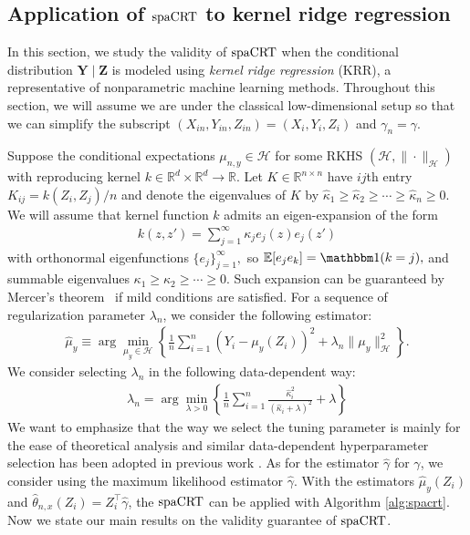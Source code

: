 \documentclass[12pt]{article}
\theoremstyle{definition}
\newcommand{\E}{\mathbb E}								%
\newcommand{\indicator}{\mathbbm 1}						%
\newcommand{\srx}{X}									%
\newcommand{\prz}{\bm Z}								%
\newcommand{\srz}{Z}									%
\newcommand{\pry}{{\bm Y}}								%
\newcommand{\sry}{Y}									%
\newcommand{\spacrt}{\textnormal{spaCRT}}               %
\begin{document}
\subsection{Application of $\spacrt$ to kernel ridge regression}\label{sec:theory_nonparametric_RF_classification}


In this section, we study the validity of $\spacrt$ when the conditional distribution $\pry\mid \prz$ is modeled using \textit{kernel ridge regression} (KRR), a representative of nonparametric machine learning methods. Throughout this section, we will assume we are under the classical low-dimensional setup so that we can simplify the subscript $(\srx_{in},\sry_{in},\srz_{in})=(\srx_{i},\sry_{i},\srz_{i})$ and $\gamma_n=\gamma$. 

Suppose the conditional expectations $\mu_{n,y}\in\mathcal{H}$ for some RKHS $(\mathcal{H},\|\cdot\|_{\mathcal{H}})$ with reproducing kernel $k\in\mathbb{R}^{d}\times \mathbb{R}^d\rightarrow\mathbb{R}$. Let $K\in\mathbb{R}^{n\times n}$ have $ij$th entry $K_{ij}=k(\srz_{i},\srz_{j})/n$ and denote the eigenvalues of $K$ by $\widehat{\kappa}_{1}\geq\widehat{\kappa}_2\geq\cdots\geq\widehat{\kappa}_n\geq 0$. We will assume that kernel function $k$ admits an eigen-expansion of the form 
\begin{align}\label{eq:eigven_expansion}
  k(z,z')=\sum_{j=1}^{\infty}\kappa_{j}e_j(z)e_j(z')
\end{align}
with orthonormal eigenfunctions $\{e_{j}\}_{j=1}^{\infty},$ so $\E[e_je_k]=\indicator(k=j),$ and summable eigenvalues $\kappa_1\geq\kappa_2\geq\cdots\geq0$. Such expansion can be guaranteed by Mercer's theorem~\citep[Theorem 12.20,][]{Wainwright2019} if mild conditions are satisfied. For a sequence of regularization parameter $\lambda_n$, we consider the following estimator:
\begin{align}\label{eq:KRR_mu_y}
  \widehat{\mu}_{y}\equiv\arg\min_{\mu_{y}\in\mathcal{H}} \left\{\frac{1}{n}\sum_{i=1}^n (\sry_{i}-\mu_{y}(\srz_{i}))^2+\lambda_n\|\mu_{y}\|_{\mathcal{H}}^2\right\}.
\end{align}
We consider selecting $\lambda_n$ in the following data-dependent way:
\begin{align}\label{eq:lambda_n}
  \lambda_n=\arg\min_{\lambda>0}\left\{\frac{1}{n}\sum_{i=1}^n\frac{\widehat{\kappa}_i^2}{(\widehat{\kappa}_i+\lambda)^2}+\lambda\right\}
\end{align}
We want to emphasize that the way we select the tuning parameter is mainly for the ease of theoretical analysis and similar data-dependent hyperparameter selection has been adopted in previous work \citet{Niu2022a,Shah2018}. As for the estimator $\widehat{\gamma}$ for $\gamma$, we consider using the maximum likelihood estimator $\widehat{\gamma}$. With the estimators $\widehat{\mu}_{y}(\srz_{i})$ and $\widehat{\theta}_{n,x}(\srz_{i})=\srz_{i}^\top\widehat{\gamma}$, the $\spacrt$ can be applied with Algorithm \ref{alg:spacrt}. Now we state our main results on the validity guarantee of $\spacrt$.
\end{document}
